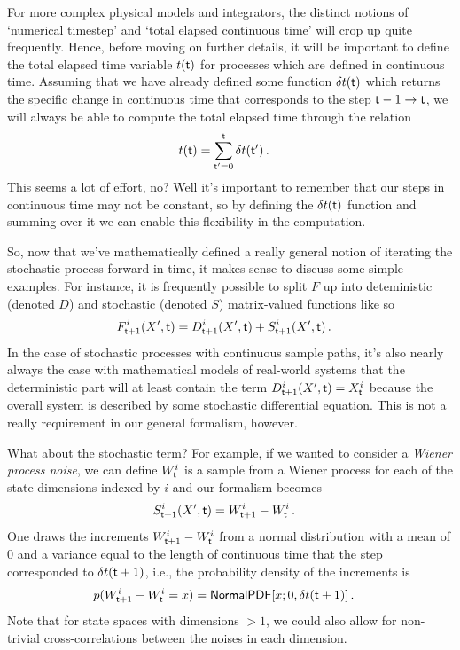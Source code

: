 \documentclass{book}
\begin{document}
For more complex physical models and integrators, the distinct notions of `numerical timestep' and `total elapsed continuous time' will crop up quite frequently. Hence, before moving on further details, it will be important to define the total elapsed time variable $t({\sf t})$ for processes which are defined in continuous time. Assuming that we have already defined some function $\delta t({\sf t})$ which returns the specific change in continuous time that corresponds to the step ${\sf t}-1 \rightarrow {\sf t}$, we will always be able to compute the total elapsed time through the relation
\begin{align}
t({\sf t}) &= \sum^{{\sf t}}_{{\sf t}'=0}\delta t({\sf t}') \,.
\end{align}
This seems a lot of effort, no? Well it's important to remember that our steps in continuous time may not be constant, so by defining the $\delta t({\sf t})$ function and summing over it we can enable this flexibility in the computation.

So, now that we've mathematically defined a really general notion of iterating the stochastic process forward in time, it makes sense to discuss some simple examples. For instance, it is frequently possible to split $F$ up into deteministic (denoted $D$) and stochastic (denoted $S$) matrix-valued functions like so
\begin{align}
& F^{i}_{{\sf t}+1}(X',{\sf t}) = D^{i}_{{\sf t}+1}(X',{\sf t}) + S^{i}_{{\sf t}+1}(X',{\sf t}) \,.
\end{align}
In the case of stochastic processes with continuous sample paths, it's also nearly always the case with mathematical models of real-world systems that the deterministic part will at least contain the term $D^{i}_{{\sf t}+1}(X',{\sf t}) = X^i_{\sf t}$ because the overall system is described by some stochastic differential equation. This is not a really requirement in our general formalism, however.

What about the stochastic term? For example, if we wanted to consider a \emph{Wiener process noise}, we can define $W^i_{{\sf t}}$ is a sample from a Wiener process for each of the state dimensions indexed by $i$ and our formalism becomes
\begin{align}
& S^{i}_{{\sf t}+1}(X',{\sf t}) = W^i_{{\sf t}+1}-W^i_{\sf t} \label{eq:wiener}\,.
\end{align}
One draws the increments $W^i_{{\sf t}+1}-W^i_{\sf t}$ from a normal distribution with a mean of $0$ and a variance equal to the length of continuous time that the step corresponded to $\delta t({\sf t}+1)$, i.e., the probability density of the increments is
\begin{align}
p(W^i_{{\sf t}+1}-W^i_{\sf t}=x) &= {\sf NormalPDF}[x;0,\delta t({\sf t}+1)] \,.
\end{align}
Note that for state spaces with dimensions $>1$, we could also allow for non-trivial cross-correlations between the noises in each dimension.
\end{document}
